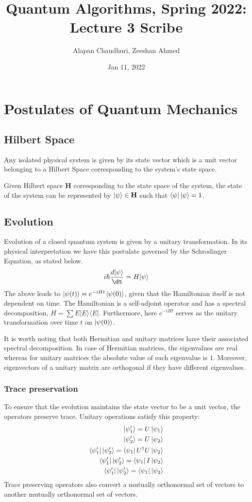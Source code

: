 \documentclass[11.5pt, paper=a4]{article}
\title{Quantum Algorithms, Spring 2022: Lecture 3 Scribe}
\author{Alapan Chaudhuri, Zeeshan Ahmed}
\date{Jan 11, 2022}
\theoremstyle{definition}
\numberwithin{theorem}{section}
\begin{document}
\maketitle

\section{Postulates of Quantum Mechanics}
\subsection{Hilbert Space}
Any isolated physical system is given by its state vector which is a unit vector belonging to a Hilbert Space corresponding to the system's state space.

Given Hilbert space $\mathbf{H}$ corresponding to the state space of the system, the state of the system can be represented by $\ket{\psi} \in \mathbf{H}$ such that $\bra{\psi}\ket{\psi} = 1$.

\subsection{Evolution}
Evolution of a closed quantum system is given by a unitary transformation. In its physical interpretation we have this postulate governed by the Schrodinger Equation, as stated below.
$$
i{\hslash}\frac{d\vert\psi\rangle}{\dt} = H\vert\psi\rangle
$$
The above leads to $\ket{\psi(t)} = e^{-iHt}\ket{\psi(0)}$, given that the Hamiltonian itself is not dependent on time. The Hamiltonian is a self-adjoint operator and has a spectral decomposition, $H = \sum E\vert E\rangle\langle E\vert$. Furthermore, here $e^{-iHt}$ serves as the unitary transformation over time $t$ on $\ket{\psi(0)}$.\newline

It is worth noting that both Hermitian and unitary matrices have their associated spectral decomposition. In case of Hermitian matrices, the eigenvalues are real whereas for unitary matrices the absolute value of each eigenvalue is $1$. Moreover, eigenvectors of a unitary matrix are orthogonal if they have different eigenvalues.

\subsubsection{Trace preservation}
To ensure that the evolution maintains the state vector to be a unit vector, the operators preserve trace. Unitary operations satisfy this property:
\begin{align*}
    \ket{\psi_1'} = U \ket{\psi_1} \\
    \ket{\psi_2'} = U \ket{\psi_2} \\
    \bra{\psi_1'}\ket{\psi_2'} = \bra{\psi_1}U^\dag U \ket{\psi_2} \\ 
    \bra{\psi_1'}\ket{\psi_2'} = \bra{\psi_1} I \ket{\psi_2} \\
    \bra{\psi_1'}\ket{\psi_2'} = \bra{\psi_1} \ket{\psi_2} \\
\end{align*}
Trace preserving operators also convert a mutually orthonormal set of vectors to another mutually orthonormal set of vectors.
 
\end{document}
